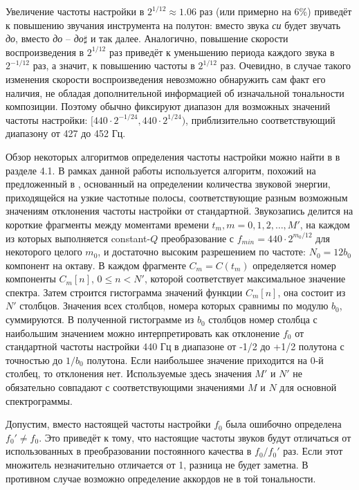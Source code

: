 Увеличение частоты настройки в $2^{1/12} \approx 1.06$ раз (или примерно на 6\%)
приведёт к повышению звучания инструмента на полутон: вместо звука \emph{си}
будет звучать \emph{до}, вместо \emph{до} -- \emph{до}$\sharp$ и так далее.
Аналогично, повышение скорости воспроизведения в $2^{1/12}$ раз приведёт к
уменьшению периода каждого звука в $2^{-1/12}$ раз, а значит, к повышению
частоты в $2^{1/12}$ раз. Очевидно, в случае такого изменения скорости
воспроизведения невозможно обнаружить сам факт его наличия, не обладая
дополнительной информацией об изначальной тональности композиции. Поэтому обычно
фиксируют диапазон для возможных значений частоты настройки: $[440 \cdot
2^{-1/24}, 440 \cdot 2^{1/24})$, приблизительно соответствующий диапазону от 427
до 452 Гц.

Обзор некоторых алгоритмов определения частоты настройки можно найти в
\cite{Lerch2006} в разделе 4.1. В рамках данной работы используется алгоритм,
похожий на предложенный в \cite{Zhu2005}, основанный на определении количества
звуковой энергии, приходящейся на узкие частотные полосы, соответствующие разным
возможным значениям отклонения частоты настройки от стандартной. Звукозапись
делится на короткие фрагменты между моментами времени $t_m, m = 0, 1, 2, \dots,
M'$, на каждом из которых выполняется constant-$Q$ преобразование с $f_{min} =
440 \cdot 2^{m_0/12}$ для некоторого целого $m_0$, и достаточно высоким
разрешением по частоте: $N_0 = 12 b_0$ компонент на октаву. В каждом фрагменте
$C_m = C(t_m)$ определяется номер компоненты $C_m[n]$, $0 \leq n < N'$, которой
соответствует максимальное значение спектра. Затем строится гистограмма значений
функции $C_m[n]$, она состоит из $N'$ столбцов. Значения всех столбцов, номера
которых сравнимы по модулю $b_0$, суммируются. В полученной гистограмме из $b_0$
столбцов номер столбца с наибольшим значением можно интерпретировать как
отклонение $f_0$ от стандартной частоты настройки 440 Гц в диапазоне от -1/2 до
+1/2 полутона с точностью до $1/b_0$ полутона. Если наибольшее значение
приходится на 0-й столбец, то отклонения нет. Используемые здесь значения $M'$ и
$N'$ не обязательно совпадают с соответствующими значениями $M$ и $N$ для
основной спектрограммы.

Допустим, вместо настоящей частоты настройки $f_0$ была ошибочно определена
$f_0' \neq f_0$. Это приведёт к тому, что настоящие частоты звуков будут
отличаться от использованных в преобразовании постоянного качества в $f_0 /
f_0'$ раз. Если этот множитель незначительно отличается от 1, разница не будет
заметна. В противном случае возможно определение аккордов не в той тональности.

